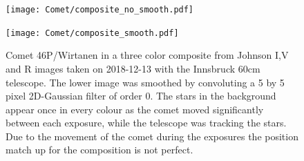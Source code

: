 \documentclass{article}
\begin{document}
\begin{figure}[H]
    \centering
    \begin{minipage}{1.\textwidth}
    \centering
       \texttt{[image: Comet/composite\_no\_smooth.pdf]}
    \end{minipage}
       \begin{minipage}{1.\textwidth}
       \centering
       \texttt{[image: Comet/composite\_smooth.pdf]}
    \end{minipage}
 
    \caption{Comet 46P/Wirtanen in a three color composite from Johnson I,V and R images taken on 2018-12-13 with the Innsbruck 60cm telescope. The lower image was smoothed by convoluting a 5 by 5 pixel 2D-Gaussian filter of order 0. The stars in the background appear once in every colour as the comet moved significantly between each exposure, while the telescope was tracking the stars. Due to the movement of the comet during the exposures the position match up for the composition is not perfect.}
    \label{fig:wirtanen}
\end{figure}
\end{document}
